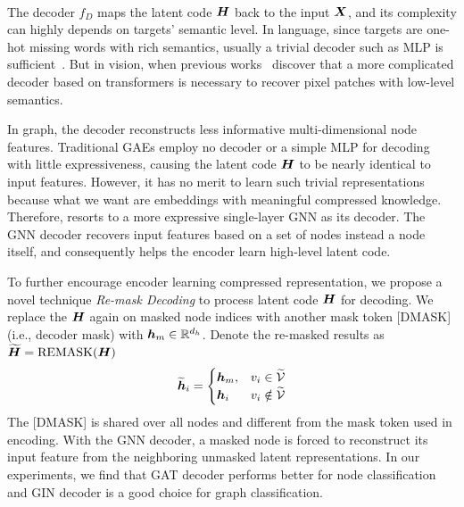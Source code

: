 {~\\
The decoder $f_D$ maps the latent code ${\bm{H}}$ back to the input ${\bm{X}}$, and its complexity can highly depends on targets' semantic level. In language, since targets are one-hot missing words with rich semantics, usually a trivial decoder such as MLP is sufficient~\cite{devlin2019bert}. But in vision, when previous works~\cite{he2021masked} discover that a more complicated decoder based on transformers is necessary to recover pixel patches with low-level semantics.

In graph, the decoder reconstructs less informative multi-dimensional node features. 
Traditional GAEs employ no decoder or a simple MLP for decoding with little expressiveness, causing the latent code ${\bm{H}}$ to be nearly identical to input features. However, it has no merit to learn such trivial representations because what we want are embeddings with meaningful compressed knowledge. Therefore, \model resorts to a more expressive single-layer GNN as its decoder. The GNN decoder recovers input features based on a set of nodes instead a node itself, and consequently helps the encoder learn high-level latent code.

To further encourage encoder learning compressed representation, we propose a novel technique \textit{Re-mask Decoding} to process latent code ${\bm{H}}$ for decoding. We replace the ${\bm{H}}$ again on masked node indices with another mask token [DMASK] (i.e., decoder mask) with ${\bm{h}}_m \in \mathbb{R}^{d_h}$. Denote the re-masked results as $\widetilde{{\bm{H}}} = \mathrm{REMASK}({\bm{H}})$
$$
\widetilde{{\bm{h}}}_i = 
    \begin{cases}
        {\bm{h}}_m, &  v_i \in \widetilde{\mathcal{V}} \\
        {\bm{h}}_i &   v_i \notin \widetilde{\mathcal{V}} 
    \end{cases}
$$
The [DMASK] is shared over all nodes and different from the mask token used in encoding. 
With the GNN decoder, a masked node is forced to reconstruct its input feature from the neighboring unmasked latent representations. In our experiments, we find that GAT decoder performs better for node classification and GIN decoder is a good choice for graph classification. 




}

